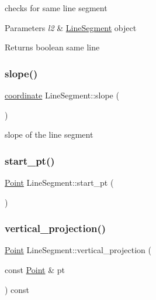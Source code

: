 checks for same line segment 
\begin{DoxyParams}{Parameters}
{\em l2} & \mbox{\hyperlink{class_line_segment}{Line\+Segment}} object \\
\hline
\end{DoxyParams}
\begin{DoxyReturn}{Returns}
boolean same line 
\end{DoxyReturn}
\mbox{\label{class_line_segment_ad13450e781bedc9ee838726cb57efabb}} 
\subsubsection{\texorpdfstring{slope()}{slope()}}
{\footnotesize\ttfamily \mbox{\hyperlink{primitives_8h_a9949b5198385a93773b854932cb22e08}{coordinate}} Line\+Segment\+::slope (\begin{DoxyParamCaption}{ }\end{DoxyParamCaption})}

slope of the line segment \mbox{\label{class_line_segment_a63afdd3fd0d5a3dc145109a5fe7231c6}} 
\subsubsection{\texorpdfstring{start\_pt()}{start\_pt()}}
{\footnotesize\ttfamily \mbox{\hyperlink{class_point}{Point}} Line\+Segment\+::start\+\_\+pt (\begin{DoxyParamCaption}{ }\end{DoxyParamCaption})}

\mbox{\label{class_line_segment_ad057b30e155ee8a82c7aa425ba22682e}} 
\subsubsection{\texorpdfstring{vertical\_projection()}{vertical\_projection()}}
{\footnotesize\ttfamily \mbox{\hyperlink{class_point}{Point}} Line\+Segment\+::vertical\+\_\+projection (\begin{DoxyParamCaption}\item[{const \mbox{\hyperlink{class_point}{Point}} \&}]{pt }\end{DoxyParamCaption}) const}

